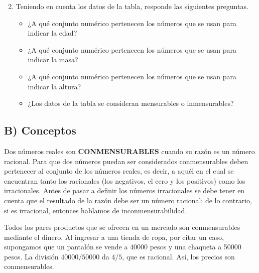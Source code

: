 \documentclass[12pt,a4paper]{article}
\begin{document}
\vspace{0.5cm}

\begin{enumerate}
\setcounter{enumi}{1}
\item Teniendo en cuenta los datos de la tabla, responde las siguientes preguntas.

\begin{itemize}
\item ¿A qué conjunto numérico pertenecen los números que se usan para indicar la edad?
\item ¿A qué conjunto numérico pertenecen los números que se usan para indicar la masa?
\item ¿A qué conjunto numérico pertenecen los números que se usan para indicar la altura?
\item ¿Los datos de la tabla se consideran mensurables o inmensurables?
\end{itemize}

\end{enumerate}

\vspace{1cm}

\subsection*{B) Conceptos}

\begin{tcolorbox}[colback=fondoverde,colframe=verdeclaro,breakable]

Dos números reales son \textbf{CONMENSURABLES} cuando su razón es un número racional. Para que dos números puedan ser considerados conmensurables deben pertenecer al conjunto de los números reales, es decir, a aquél en el cual se encuentran tanto los racionales (los negativos, el cero y los positivos) como los irracionales. Antes de pasar a definir los números irracionales se debe tener en cuenta que el resultado de la razón debe ser un número racional; de lo contrario, si es irracional, entonces hablamos de inconmensurabilidad.

\vspace{0.5cm}

Todos los pares productos que se ofrecen en un mercado son conmensurables mediante el dinero. Al ingresar a una tienda de ropa, por citar un caso, supongamos que un pantalón se vende a 40000 pesos y una chaqueta a 50000 pesos. La división $40000 / 50000$ da $4/5$, que es racional. Así, los precios son conmensurables.

\end{tcolorbox}
\end{document}
